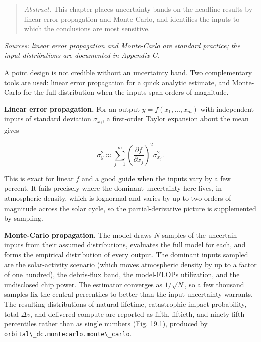 \documentclass[
  11pt,
  openany,
  oneside]{book}
\newcommand{\passthrough}[1]{#1}
\begin{document}
\begin{quote}
\emph{Abstract.} This chapter places uncertainty bands on the headline
results by linear error propagation and Monte-Carlo, and identifies the
inputs to which the conclusions are most sensitive.
\end{quote}

\emph{Sources: linear error propagation and Monte-Carlo are standard
practice; the input distributions are documented in Appendix C.}

A point design is not credible without an uncertainty band. Two
complementary tools are used: linear error propagation for a quick
analytic estimate, and Monte-Carlo for the full distribution when the
inputs span orders of magnitude.

\textbf{Linear error propagation.} For an output
\(y = f(x_1,\dots,x_m)\) with independent inputs of standard deviation
\(\sigma_{x_j}\), a first-order Taylor expansion about the mean gives

\begin{equation}
\sigma_y^2 \approx \sum_{j=1}^{m}\left(\frac{\partial f}{\partial x_j}\right)^2 \sigma_{x_j}^2. \tag{19.1}
\end{equation}

This is exact for linear \(f\) and a good guide when the inputs vary by
a few percent. It fails precisely where the dominant uncertainty here
lives, in atmospheric density, which is lognormal and varies by up to
two orders of magnitude across the solar cycle, so the
partial-derivative picture is supplemented by sampling.

\textbf{Monte-Carlo propagation.} The model draws \(N\) samples of the
uncertain inputs from their assumed distributions, evaluates the full
model for each, and forms the empirical distribution of every output.
The dominant inputs sampled are the solar-activity scenario (which moves
atmospheric density by up to a factor of one hundred), the debris-flux
band, the model-FLOPs utilization, and the undisclosed chip power. The
estimator converges as \(1/\sqrt{N}\), so a few thousand samples fix the
central percentiles to better than the input uncertainty warrants. The
resulting distributions of natural lifetime, catastrophic-impact
probability, total \(\Delta v\), and delivered compute are reported as
fifth, fiftieth, and ninety-fifth percentiles rather than as single
numbers (Fig. 19.1), produced by
\passthrough{\lstinline!orbital\_dc.montecarlo.monte\_carlo!}.
\end{document}
